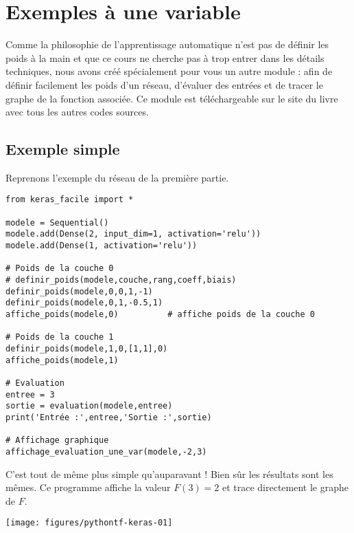 \documentclass[11pt,class=report,crop=false]{standalone}
\begin{document}
\section{Exemples à une variable}
\label{sec:keras_facile}

Comme la philosophie de l'apprentissage automatique n'est pas de définir les poids à la main et que ce cours ne cherche pas à trop entrer dans les détails techniques, nous avons créé spécialement pour vous un autre module : 
afin de définir facilement les poids d'un réseau, d'évaluer des entrées et de tracer le graphe de la fonction associée. Ce module est téléchargeable sur le site du livre avec tous les autres codes sources.

\subsection{Exemple simple}

Reprenons l'exemple du réseau de la première partie.




\begin{lstlisting}
from keras_facile import *

modele = Sequential()
modele.add(Dense(2, input_dim=1, activation='relu'))
modele.add(Dense(1, activation='relu'))

# Poids de la couche 0
# definir_poids(modele,couche,rang,coeff,biais)
definir_poids(modele,0,0,1,-1)  
definir_poids(modele,0,1,-0.5,1)
affiche_poids(modele,0)          # affiche poids de la couche 0

# Poids de la couche 1
definir_poids(modele,1,0,[1,1],0) 
affiche_poids(modele,1) 

# Evaluation
entree = 3
sortie = evaluation(modele,entree)
print('Entrée :',entree,'Sortie :',sortie)

# Affichage graphique
affichage_evaluation_une_var(modele,-2,3)
\end{lstlisting}

C'est tout de même plus simple qu'auparavant !
Bien sûr les résultats sont les mêmes. Ce programme affiche la valeur $F(3) = 2$
et trace directement le graphe de $F$.

\begin{center}
\texttt{[image: figures/pythontf-keras-01]}
\end{center}
\end{document}
